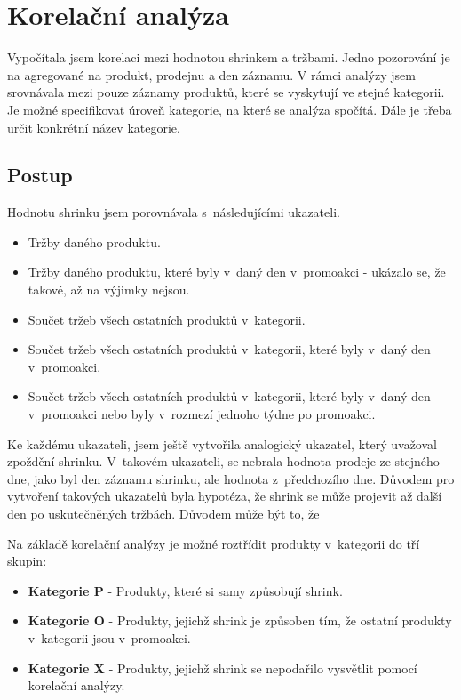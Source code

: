 \newpage
\chapter{Korelační analýza}

Vypočítala jsem korelaci mezi hodnotou shrinkem a tržbami. Jedno pozorování je na agregované na produkt, prodejnu a den záznamu. 
V rámci analýzy jsem srovnávala mezi pouze záznamy produktů, které se vyskytují ve stejné kategorii. Je možné specifikovat úroveň kategorie, na které se analýza spočítá. Dále je třeba určit konkrétní název kategorie.



\section{Postup}
\label{sec:korpostup}

Hodnotu shrinku jsem porovnávala s~následujícími ukazateli. 
\begin{itemize}
    \itemsep0em 

    \item Tržby daného produktu.
    \item Tržby daného produktu, které byly v~daný den v~promoakci - ukázalo se, že takové, až na výjimky nejsou.
    \item Součet tržeb všech ostatních produktů v~kategorii.
    \item Součet tržeb všech ostatních produktů v~kategorii, které byly v~daný den v~promoakci.
    \item Součet tržeb všech ostatních produktů v~kategorii, které byly v~daný den v~promoakci nebo byly v~rozmezí jednoho týdne po promoakci.
\end{itemize}

Ke každému ukazateli, jsem ještě vytvořila analogický ukazatel, který uvažoval zpoždění shrinku. V~takovém ukazateli, se nebrala hodnota prodeje ze stejného dne, jako byl den záznamu shrinku, ale hodnota z~předchozího dne. Důvodem pro vytvoření takových ukazatelů byla hypotéza, že shrink se může projevit až další den po uskutečněných tržbách. Důvodem může být to, že 

Na základě korelační analýzy je možné roztřídit produkty v~kategorii do tří skupin:
\begin{itemize}
    \itemsep0em 
    \item[] \textbf{Kategorie P} - Produkty, které si samy způsobují shrink.
    \item[] \textbf{Kategorie O} - Produkty, jejichž shrink je způsoben tím, že ostatní produkty v~kategorii jsou v~promoakci.
    \item[] \textbf{Kategorie X} - Produkty, jejichž shrink se nepodařilo vysvětlit pomocí korelační analýzy.
\end{itemize}

